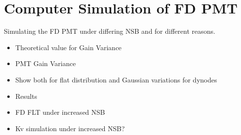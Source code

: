 \chapter{Computer Simulation of FD PMT}\label{Ch:CompSimPMT}

Simulating the FD PMT under differing NSB and for different reasons.
\begin{itemize}
\item Theoretical value for Gain Variance
\item PMT Gain Variance
\item Show both for flat distribution and Gaussian variations for dynodes
\item Results
\item FD FLT under increased NSB
\item Kv simulation under increased NSB?
\end{itemize}

